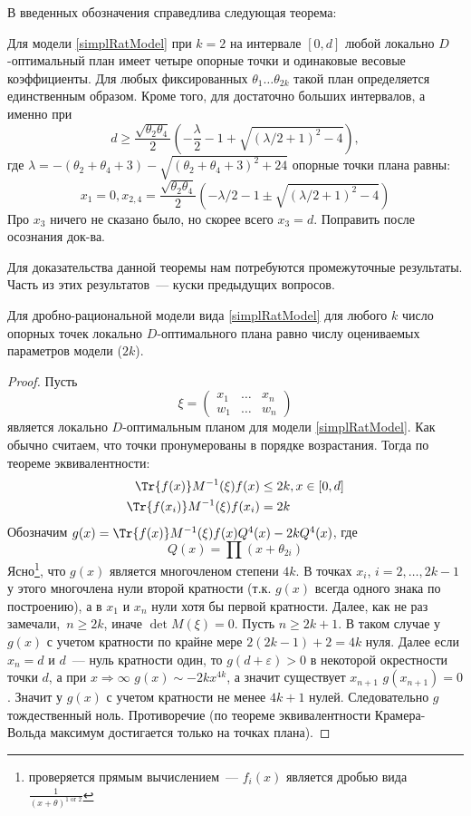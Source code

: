 В введенных обозначения справедлива следующая теорема:
\begin{thm}
Для модели \eqref{simplRatModel} при $k=2$ на интервале $[0,d]$ любой локально $D$-оптимальный план имеет четыре опорные точки и одинаковые весовые коэффициенты. Для любых фиксированных $\theta_1…\theta_{2k}$ такой план определяется единственным образом. Кроме того, для достаточно больших интервалов, а именно при 
$$ d \geq \frac{\sqrt{\theta_2\theta_4}}{2}\left(-\frac{\lambda}{2}-1+\sqrt{(\lambda/2 +1)^2 - 4}\right), $$
где $\lambda = -(\theta_2 + \theta_4 + 3) - \sqrt{(\theta_2+\theta_4+3)^2 + 24}$
опорные точки плана равны:
$$ x_1 = 0, x_{2,4} = \frac{\sqrt{\theta_2\theta_4}}{2} (-\lambda / 2 - 1 ± \sqrt{(\lambda /2 + 1)^2-4})$$
{\color{blue} Про $x_3$ ничего не сказано было, но скорее всего $x_3 = d$. Поправить после осознания док-ва.}
\end{thm}


Для доказательства данной теоремы нам потребуются промежуточные результаты. Часть из этих результатов — куски предыдущих вопросов. 

\begin{thm}
\label{rationalParamCountThm}
Для дробно-рациональной модели вида \eqref{simplRatModel} для любого $k$ число опорных точек локально $D$-оптимального плана равно числу оцениваемых параметров модели ($2k$).
\end{thm}
\begin{proof}
Пусть 
$$\xi = \begin{pmatrix} x_1 & … & x_n \\ w_1 & … & w_n \end{pmatrix}$$
является локально $D$-оптимальным планом для модели \eqref{simplRatModel}. Как обычно считаем, что точки пронумерованы в порядке возрастания. Тогда по теореме эквивалентности:
\begin{equation}
\begin{split}
\Tr{f(x)}M^{-1}(\xi)f(x) &\leq 2k, x\in[0,d] \\
\Tr{f(x_i)}M^{-1}(\xi)f(x_i) & = 2k
\end{split}
\end{equation}
Обозначим $g(x) = \Tr{f(x)}M^{-1}(\xi)f(x) Q^{4}(x) - 2k Q^{4}(x)$, где 
$$Q(x) = \prod (x+ \theta_{2i})$$
Ясно\footnote{проверяется прямым вычислением — $f_i(x)$ является дробью вида 
$\frac{1}{(x+\theta)^{1 \text{ or } 2}}$}, что $g(x)$ является многочленом степени $4k$. В точках $x_i$, $i=2, …, 2k-1$ у этого многочлена нули второй кратности (т.к. $g(x)$ всегда одного знака по построению), а в $x_1$ и $x_{n}$ нули хотя бы первой кратности. 
Далее, как не раз замечали, $n \geq 2k$, иначе $\det M(\xi) = 0$. 
Пусть $n \geq 2k+1$. В таком случае у $g(x)$ с учетом кратности по крайне мере $2(2k-1) +2 = 4k$ нуля. Далее
если $x_n = d$ и $d$ — нуль кратности один, то $g(d+\varepsilon) > 0$ в некоторой окрестности точки $d$, а при 
$x\Rightarrow \infty$ $g(x) \sim -2kx^{4k}$, а значит существует $x_{n+1}$ $g(x_{n+1}) = 0$. Значит у $g(x)$ с учетом кратности не менее $4k+1$ нулей. Следовательно $g$ тождественный ноль. Противоречие (по теореме эквивалентности Крамера-Вольда максимум достигается только на точках плана). 
\end{proof}

